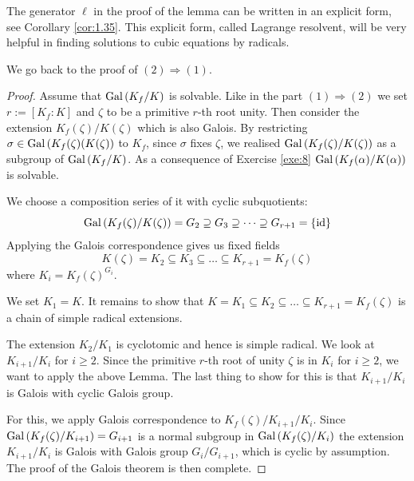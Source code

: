 \documentclass[twoside = false,	%
		headsepline,		%
		parskip = true,
		]{scrbook}						%
\begin{document}
    
   {\color{blue}The generator $\ell$ in the proof of the lemma can be written in an explicit form, see Corollary \ref{cor:1.35}. This explicit form, called Lagrange resolvent, will be very helpful in finding solutions to cubic equations by radicals.}
    
    
    We go back to the proof of $(2) \Rightarrow (1)$.
    
    \begin{proof}
    
    Assume that $\mathrm{Gal}\left( K_f/K\right)$ is solvable. Like in the part $(1) \Rightarrow (2)$ we set $r:=[K_f:K]$ and $\zeta$ to be a primitive $r$-th root unity. Then consider the extension $K_f(\zeta)/K(\zeta)$ which is also Galois. By restricting $\sigma \in \mathrm{Gal}\left( K_f(\zeta)(K(\zeta)\right)$ to $K_f$, since $\sigma$ fixes $\zeta$, we realised $\mathrm{Gal}\left( K_f(\zeta)/K(\zeta)\right)$ as a subgroup of $\mathrm{Gal}\left( K_f/K\right)$. As a consequence of Exercise \ref{exe:8} $\mathrm{Gal}\left( K_f(\alpha)/K(\alpha)\right)$ is solvable.
    
    We choose a composition series of it with cyclic subquotients:
    \begin{equation*}
        \mathrm{Gal}\left( K_f(\zeta)/K(\zeta)\right) = G_2 \supseteq G_3 \supseteq \dots \supseteq G_{r+1} = \{\mathrm{id}\}
    \end{equation*}
    Applying the Galois correspondence gives us fixed fields
    \begin{equation*}
        K(\zeta) = K_2 \subseteq K_3 \subseteq \dots \subseteq K_{r+1} = K_f(\zeta)
    \end{equation*}
    where $K_i = K_f(\zeta)^{G_i}$.
    
    We set $K_1 = K$. It remains to show that $K = K_1 \subseteq K_2 \subseteq \dots \subseteq K_{r+1} = K_f(\zeta)$ is a chain of simple radical extensions.
    
    The extension $K_2 / K_1$ is cyclotomic and hence is simple radical. We look at $K_{i+1}/K_i$ for $i \geq 2$.
    Since the primitive $r$-th root of unity $\zeta$ is in $K_i$ for $i \geq 2$, we want to apply the above Lemma.
    The last thing to show for this is that $K_{i+1}/K_i$ is Galois with cyclic Galois group.
    
    For this, we apply Galois correspondence to $K_f(\zeta)/K_{i+1}/K_i$. 
    Since $\mathrm{Gal}\left( K_f(\zeta)/K_{i+1}\right) = G_{i+1}$ is a normal subgroup in $\mathrm{Gal}\left( K_f(\zeta)/K_i\right)$ the extension $K_{i+1}/K_i$ is Galois with Galois group $G_i/G_{i+1}$, which is cyclic by assumption.
    The proof of the Galois theorem is then complete.    
    \end{proof}
    
\end{document}
